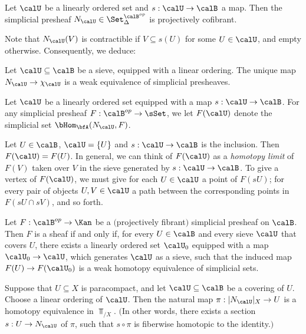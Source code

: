 \begin{corollary}
Let $\calU$ be a linearly ordered set and $s: \calU \rightarrow \calB$ a map. Then the simplicial presheaf $N_{\calU} \in \Set_{\Delta}^{\calB^{op}}$ is projectively cofibrant.
\end{corollary}

Note that $N_{\calU}(V)$ is contractible if $V \subseteq s(U)$ for some $U \in \calU$, and empty otherwise. Consequently, we deduce:

\begin{corollary}
Let $\calU \subseteq \calB$ be a sieve, equipped with a linear ordering.
The unique map $N_{\calU} \rightarrow \chi_{\calU}$ is a weak equivalence of simplicial presheaves.
\end{corollary}

\begin{notation}
Let $\calU$ be a linearly ordered set equipped with a map $s: \calU \rightarrow \calB$.
For any simplicial presheaf $F: \calB^{op} \rightarrow \sSet$, we let
$F(\calU)$ denote the simplicial set $\bHom_{\bfA}( N_{\calU}, F)$.
\end{notation}

\begin{remark}
Let $U \in \calB$, $\calU = \{ U\}$ and $s: \calU \rightarrow \calB$ is the inclusion. Then $F( \calU ) = F(U)$. In general, we can think of $F( \calU)$ as a {\it homotopy limit} of $F(V)$ taken over
$V$ in the sieve generated by $s: \calU \rightarrow \calB$. To give a vertex of $F(\calU)$, we must give for each $U \in \calU$ a point of $F( sU)$; for every pair of objects $U, V \in \calU$ a path between the corresponding points in $F( sU \cap sV)$, and so forth.
\end{remark}

\begin{corollary}\label{critsheaf}
Let $F: \calB^{op} \rightarrow \Kan$ be a $($projectively fibrant$)$ simplicial presheaf on $\calB$. Then $F$ is a sheaf if and only if, for every $U \in \calB$ and every sieve $\calU$ that covers $U$, there
exists a linearly ordered set $\calU_0$ equipped with a map $\calU_0 \rightarrow \calU$, which generates $\calU$ as a sieve, such that the induced map
$F(U) \rightarrow F(\calU_0)$ is a weak homotopy equivalence of simplicial sets.
\end{corollary}

\begin{lemma}\label{partit}
Suppose that $U \subseteq X$ is paracompact, and let $\calU \subseteq \calB$ be a covering
of $U$. Choose a linear ordering of $\calU$. Then the natural map 
$\pi: |N_{\calU}|_{X} \rightarrow U$ is a homotopy equivalence in $\Top_{/X}$.
$($In other words, there exists a section $s: U \rightarrow N_{\calU}$ of $\pi$, such that
$s \circ \pi$ is fiberwise homotopic to the identity.$)$
\end{lemma}

